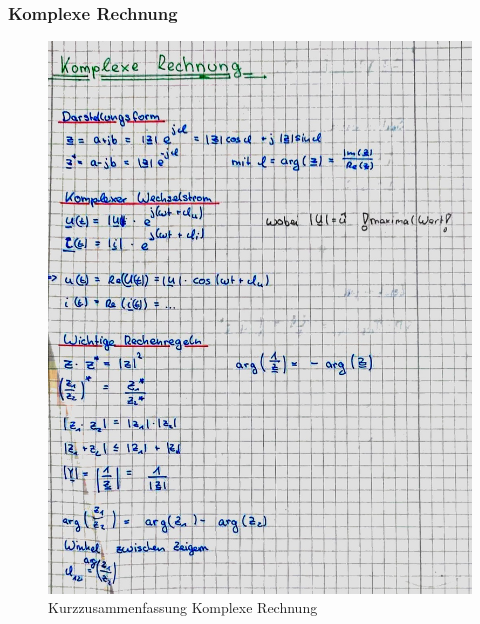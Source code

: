 \documentclass[12pt,a4paper]{article}%
\numberwithin{equation}{section}
\numberwithin{equation}{subsection}
\begin{document}
  \subsubsection{Komplexe Rechnung}
\begin{figure}[H] 
	  \centering
	  \includegraphics[width=1\textwidth]{6_KomplRechnung.jpg}
	  \caption{Kurzzusammenfassung Komplexe Rechnung}
	  \label{fig:Komplexe Rechnung}
  \end{figure}
  \newpage
\end{document}

